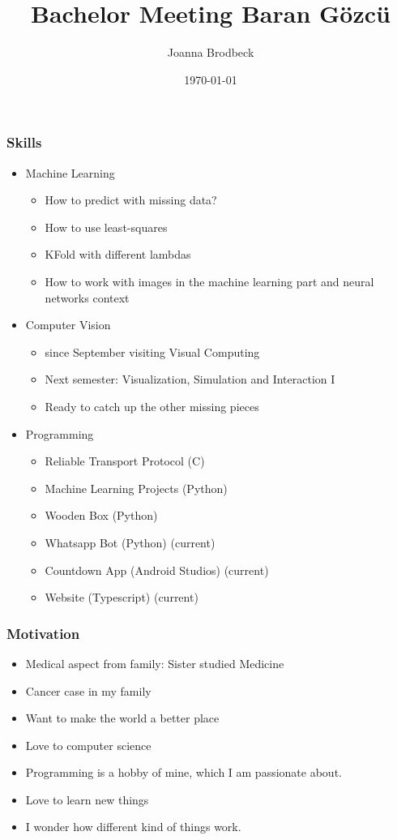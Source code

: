 \documentclass{article}
\title{Bachelor Meeting Baran Gözcü}
\author{Joanna Brodbeck}
\date{\today}
\begin{document}
\maketitle


\subsubsection*{Skills}
\begin{itemize}
    \item Machine Learning
    \begin{itemize}
        \item How to predict with missing data?
        \item How to use least-squares
        \item KFold with different lambdas
        \item How to work with images in the machine learning part and neural networks context
    \end{itemize}
    \item Computer Vision
    \begin{itemize}
        \item since September visiting Visual Computing
        \item Next semester: Visualization, Simulation and Interaction I
        \item Ready to catch up the other missing pieces
    \end{itemize}
    \item Programming
    \begin{itemize}
        \item Reliable Transport Protocol (C)
        \item Machine Learning Projects (Python)
        \item Wooden Box (Python)
        \item Whatsapp Bot (Python) (current)
        \item Countdown App (Android Studios) (current)
        \item Website (Typescript) (current)
    \end{itemize}
\end{itemize}

\subsubsection*{Motivation}
\begin{itemize}
    \item Medical aspect from family: Sister studied Medicine
    \item Cancer case in my family
    \item Want to make the world a better place
    \item Love to computer science
    \item Programming is a hobby of mine, which I am passionate about.
    \item Love to learn new things
    \item I wonder how different kind of things work.
\end{itemize}
\end{document}
